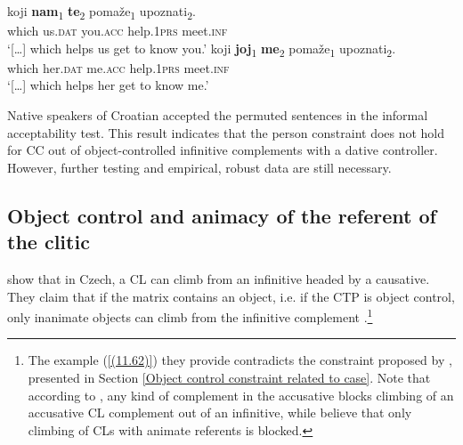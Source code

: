 \begin{exe}\ex\begin{xlist}
\ex\label{(11.57b)}
\gll [\dots] koji \textbf{nam}\textsubscript{1} \textbf{te}\textsubscript{2} pomaže\textsubscript{1} upoznati\textsubscript{2}. \\
{} which us.\textsc{dat} you.\textsc{acc} help.1\textsc{prs} meet.\textsc{inf} \\
\glt `[\dots] which helps us get to know you.'
\ex\label{(11.57c)}
\gll [\dots] koji \textbf{joj}\textsubscript{1} \textbf{me}\textsubscript{2} pomaže\textsubscript{1} upoznati\textsubscript{2}.\\
{} which her.\textsc{dat} me.\textsc{acc} help.1\textsc{prs} meet.\textsc{inf} \\
 \glt ‘[\dots] which helps her get to know me.’
\hfill 
\end{xlist}
\end{exe}

\noindent Native speakers of Croatian accepted the permuted sentences in the informal acceptability test. This result indicates that the person constraint does not hold for CC out of object-controlled infinitive complements with a dative controller. However, further testing and empirical, robust data are still necessary.

\subsection{Object control and animacy of the referent of the clitic}
\label{Object control and animacy of the referent of the clitic}
\citet{LelandToman76} show that in Czech, a CL can climb from an infinitive headed by a causative. They claim that if the matrix contains an object, i.e. if the CTP is object control, only inanimate objects can climb from the infinitive complement \citep[cf.][241]{LelandToman76}.\footnote{The example (\ref{(11.62)}) they provide contradicts the constraint proposed by \citet{Rezac05}, presented in Section \ref{Object control constraint related to case}. Note that according to \citet{Rezac05}, any kind of complement in the accusative blocks climbing of an accusative CL complement out of an infinitive, while \citet{LelandToman76} believe that only climbing of CLs with animate referents is blocked.}

